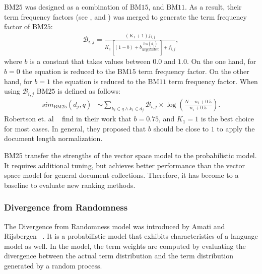 BM$25$ was designed as a combination of BM$15$, and BM$11$. As a result, their term frequency factors (see , and ) was merged to generate the term frequency factor of BM$25$:
\begin{align}
  \mathcal{B}_{i, j} = \frac{(K_1 + 1) f_{i, j}}{K_1 \left[(1 - b) + b \frac{len(d_j)}{avg\_doclen} \right] + f_{i, j}},
\end{align}
where $b$ is a constant that takes values between $0.0$ and $1.0$. On the one hand, for $b = 0$ the equation is reduced to the BM$15$ term frequency factor. On the other hand, for $b = 1$ the equation is reduced to the BM$11$ term frequency factor. When using $\mathcal{B}_{i, j}$ BM$25$ is defined as follows:
\begin{align}
  sim_{\text{BM$25$}}(d_j, q) & \sim \sum_{k_i \in q \wedge k_i \in d_j} \mathcal{B}_{i, j} \times \log \left(\frac{N - n_i + 0.5}{n_i + 0.5}\right).
\end{align}
Robertson et. al ~\cite{RobertsonWJHG94} find in their work that $b = 0.75$, and $K_1 = 1$ is the best choice for most cases. In general, they proposed that $b$ should be close to $1$ to apply the document length normalization. 

BM25 transfer the strengths of the vector space model to the probabilistic model. It requires additional tuning, but achieves better performance than the vector space model for general document collections. Therefore, it has become to a baseline to evaluate new ranking methods.

\subsubsection{Divergence from Randomness}
\label{sec:divergence_from_randomness}

The Divergence from Randomness model was introduced by Amati and Rijsbergen ~\cite{AmatiR02}. It is a probabilistic model that exhibits characteristics of a language model as well. In the model, the term weights are computed by evaluating the divergence between the actual term distribution and the term distribution generated by a random process.


